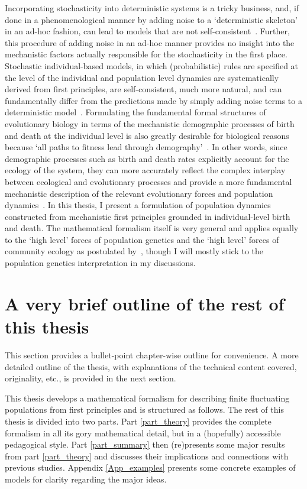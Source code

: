 Incorporating stochasticity into deterministic systems is a tricky business, and, if done in a phenomenological manner by adding noise to a `deterministic skeleton'~\citep{coulson_skeletons_2004} in an ad-hoc fashion, can lead to models that are not self-consistent~\citep{strang_how_2019}. Further, this procedure of adding noise in an ad-hoc manner provides no insight into the mechanistic factors actually responsible for the stochasticity in the first place. Stochastic individual-based models, in which (probabilistic) rules are specified at the level of the individual and population level dynamics are systematically derived from first principles, are self-consistent, much more natural, and can fundamentally differ from the predictions made by simply adding noise terms to a deterministic model~\citep{black_stochastic_2012,strang_how_2019}. Formulating the fundamental formal structures of evolutionary biology in terms of the mechanistic demographic processes of birth and death at the individual level is also greatly desirable for biological reasons~\citep{metcalf_why_2007,geritz_mathematical_2012} because `all paths to fitness lead through demography'~\citep{metcalf_all_2007}. In other words, since demographic processes such as birth and death rates explicitly account for the ecology of the system, they can more accurately reflect the complex interplay between ecological and evolutionary processes and provide a more fundamental mechanistic description of the relevant evolutionary forces and population dynamics~\citep{doebeli_towards_2017}. In this thesis, I present a formulation of population dynamics constructed from mechanistic first principles grounded in individual-level birth and death. The mathematical formalism itself is very general and applies equally to the `high level' forces of population genetics and the `high level' forces of community ecology as postulated by~\citet{vellend_theory_2016}, though I will mostly stick to the population genetics interpretation in my discussions.

\section{A very brief outline of the rest of this thesis}
This section provides a bullet-point chapter-wise outline for convenience. A more detailed outline of the thesis, with explanations of the technical content covered, originality, etc., is provided in the next section.

This thesis develops a mathematical formalism for describing finite fluctuating populations from first principles and is structured as follows. The rest of this thesis is divided into two parts. Part \ref{part_theory} provides the complete formalism in all its gory mathematical detail, but in a (hopefully) accessible pedagogical style. Part \ref{part_summary} then (re)presents some major results from part \ref{part_theory} and discusses their implications and connections with previous studies. Appendix \ref{App_examples} presents some concrete examples of models for clarity regarding the major ideas.

